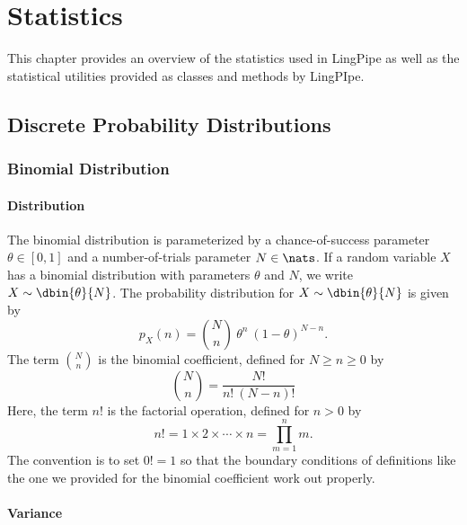 \chapter{Statistics}\label{chapter:stats}

This chapter provides an overview of the statistics used
in LingPipe as well as the statistical utilities provided
as classes and methods by LingPIpe.  


\section{Discrete Probability Distributions}


\subsection{Binomial Distribution}

\subsubsection{Distribution}

The binomial distribution is parameterized by a chance-of-success
parameter $\theta \in [0,1]$ and a number-of-trials parameter $N \in
\nats$.  If a random variable $X$ has a binomial distribution with
parameters $\theta$ and $N$, we write $X \sim \dbin{\theta}{N}$.  The
probability distribution for $X \sim \dbin{\theta}{N}$ is given by 
%
\begin{equation}
p_X(n) = {N \choose n} \ \theta^{n} \ (1-\theta)^{N-n}.
\end{equation}
%
The term ${N \choose n}$ is the binomial coefficient, defined 
for $N \geq n \geq 0$ by
%
\begin{equation}
{N \choose n} = \frac{N!}{n! \ (N-n)!}
\end{equation}
%
Here, the term $n!$ is the factorial operation, defined for $n > 0$ by
%
\begin{equation}
n! = 1 \times 2 \times \cdots \times n = \prod_{m=1}^n m.
\end{equation}
%
The convention is to set $0! = 1$ so that the boundary conditions of
definitions like the one we provided for the binomial coefficient work
out properly.

\subsubsection{Variance}\label{section:stats-binomial-variance}

